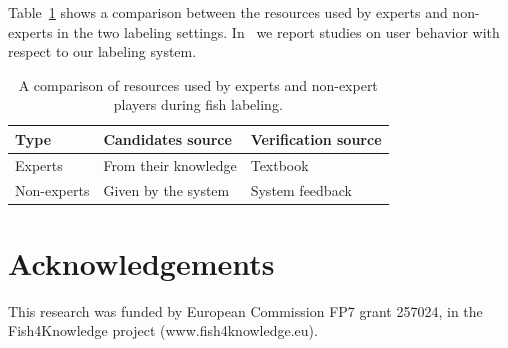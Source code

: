 \documentclass{sig-alternate}
\begin{document}
Table~\ref{tab:comp} shows a comparison between the resources used by experts and 
non-experts in the two labeling settings. In~\cite{jhe13:crowd} we report studies on user behavior with respect to 
our labeling system. 
%
\begin{table}[t!]
\caption{A comparison of resources used by experts and non-expert players during fish labeling.}
\begin{tabular}{lll}
\hline
Type & Candidates source &  Verification source \\
\hline
Experts  &  From their knowledge & Textbook\\
Non-experts & Given by the system & System feedback \\
\hline
\end{tabular}
\label{tab:comp}
\end{table}








\ifanon
\else
\section*{Acknowledgements}
This research was funded by European Commission FP7 grant 257024, in the Fish4Knowledge project (www.fish4knowledge.eu).
\fi

\renewcommand{\bibsection}{\section{\mbox{References}}}
\setlength{\bibsep}{1pt}


\end{document}
